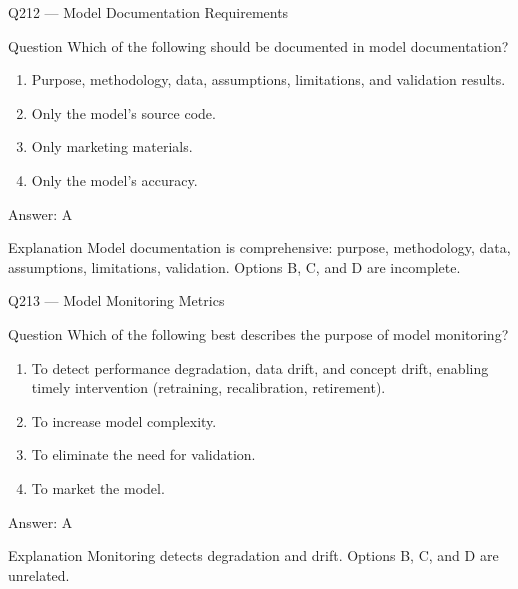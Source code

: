 \documentclass[aspectratio=169,8pt]{beamer}
\begin{document}
																			\begin{frame}{Q212 --- Model Documentation Requirements}
																				\begin{block}{Question}
																					Which of the following should be documented in model documentation?
																					\begin{enumerate}
																						\item Purpose, methodology, data, assumptions, limitations, and validation results.
																						\item Only the model's source code.
																						\item Only marketing materials.
																						\item Only the model's accuracy.
																					\end{enumerate}  \end{block}
																					\begin{exampleblock}{Answer: A}\end{exampleblock}
																					\begin{block}{Explanation}
																						Model documentation is comprehensive: purpose, methodology, data, assumptions, limitations, validation. Options B, C, and D are incomplete.
																					\end{block}
																				\end{frame}
																				
																				\begin{frame}{Q213 --- Model Monitoring Metrics}
																					\begin{block}{Question}
																						Which of the following best describes the purpose of model monitoring?
																						\begin{enumerate}
																							\item To detect performance degradation, data drift, and concept drift, enabling timely intervention (retraining, recalibration, retirement).
																							\item To increase model complexity.
																							\item To eliminate the need for validation.
																							\item To market the model.
																						\end{enumerate}  \end{block}
																						\begin{exampleblock}{Answer: A}\end{exampleblock}
																						\begin{block}{Explanation}
																							Monitoring detects degradation and drift. Options B, C, and D are unrelated.
																						\end{block}
																					\end{frame}
																					
\end{document}
